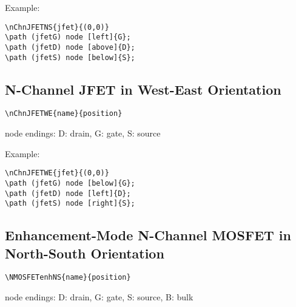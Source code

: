\documentclass[parskip=full]{scrartcl}
\begin{document}
Example:\\
\begin{minipage}{0.8\textwidth}
\begin{verbatim}
\nChnJFETNS{jfet}{(0,0)}
\path (jfetG) node [left]{G};
\path (jfetD) node [above]{D};
\path (jfetS) node [below]{S};
\end{verbatim}
\end{minipage}
\begin{minipage}{0.19\textwidth}
\end{minipage}

\subsection{N-Channel JFET in West-East Orientation}

\begin{verbatim}
\nChnJFETWE{name}{position}
\end{verbatim}
node endings: D: drain, G: gate, S: source

Example:\\
\begin{minipage}{0.8\textwidth}
\begin{verbatim}
\nChnJFETWE{jfet}{(0,0)}
\path (jfetG) node [below]{G};
\path (jfetD) node [left]{D};
\path (jfetS) node [right]{S};
\end{verbatim}
\end{minipage}
\begin{minipage}{0.19\textwidth}
\end{minipage}

\subsection{Enhancement-Mode N-Channel MOSFET in North-South Orientation}

\begin{verbatim}
\NMOSFETenhNS{name}{position}
\end{verbatim}
node endings: D: drain, G: gate, S: source, B: bulk
\end{document}
